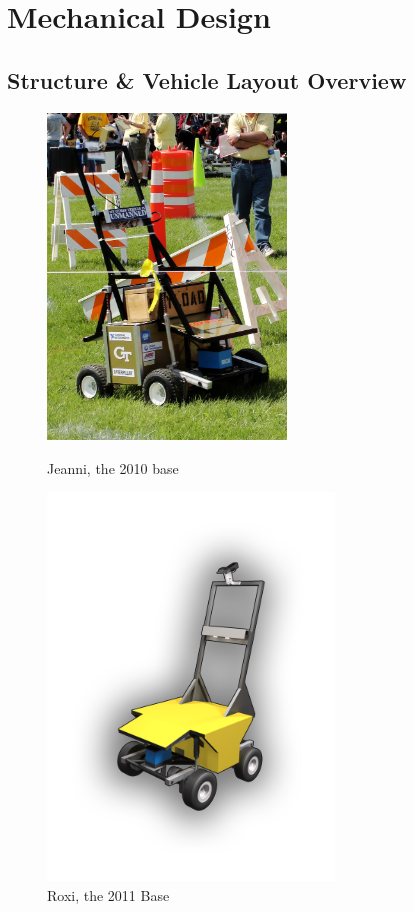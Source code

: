 \section{Mechanical Design}

\subsection{Structure \& Vehicle Layout Overview}

\begin{figure}[H]
\begin{minipage}[b]{0.5\linewidth}
\centering
\includegraphics[width=2.5in]{./pics/2010Jeanni.jpg}
\caption{Jeanni, the 2010 base}
\label{FIG:Jeanni}
\end{minipage}
\hspace{0.1in}
\begin{minipage}[b]{0.5\linewidth}
\centering
\includegraphics[width=3in]{./pics/RobotFrontCover.png}
\caption{Roxi, the 2011 Base}
\label{FIG:Roxi}
\end{minipage}
\end{figure}

